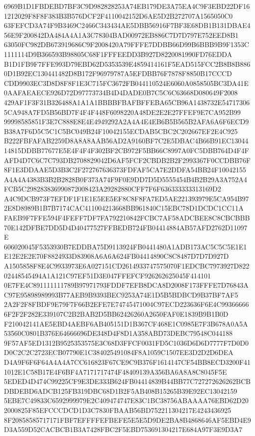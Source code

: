 \documentclass[UTF8,fontset=fandol,zihao=-4,a4paper]{ctexart}
\begin{document}
{{6969B1D1FBDEBD7BF3C9D982828253A74EB179DE3A75EA4C9F3EBD22DF161212029F8F8F383B3B576DCF2F4110042152D6AE5D2B272707A1565050C0
63FEFCD3A74F9B3469C2466C343434AE5DBB56916F7BF3E68DB1B131DBAE456E9F200842DA484A4A1A3C78304BAD00972EB886C7D7D797E752EED8B1
63050FC982DB673919686C9F2008420A79FFFE7DDBB66D99B6BBB9B9F1353C1111114D9B366593B98805C68F1FFFEEDD3B927D8220081990FD76EDDA
B1D1FB9F7FFE993D79EBD62D5353539E4859414161F5EAD515FCC2B8B8B8860D1B92EC130441482D8B172F96979787A5EFDBB76F7878F8850B17CCCD
CDD9903EC3D8D8F8F1E3C715FC3672FB044110524E6060A0858505BC3DA41E0AAFAEAECE926D72D97773734B4D4DADE0B7C5C6C63668D080649F2008
429AF1F3F31B326488A1A1A1BBBBFBAFBFFEBA65CB96A1438732E547173065CA948A7FD5B56BD7F4F4F448F6098220A48DE2E2E27FFEF9E7CA952B99
99998585851F3E7C888E8E4E4949292A2A4A4E4EB6B5B565B2AFA6A6F6ECD9B38A7F6D5C5C1C5BC049B24F10042155ECDAB5CBC2C202667EF2E4C925
B222FBFAFAB2259D8A8A8AAB56AD2A9160BF7C2E5DBAC4B66B91EC1304414815DDBB77677E5E4F4F4F302BF2CB972F5BB66C8997A0FC5DBB764D4F4F
AFD4D7C6C7C793DB2708829042D6AF5FCF2CBDB2B2F2993367F0CCDBB76F8F1E3DDAAE5D3B3C2F272767636373FDFAF5CA7E2DDFA54BB24F10042155
A4A4A4383B3B2B2828B0F373A74F9F0E9DD7D5D5555454B4B2B29A3A752A4FCB5C298283836990872008423A29282880CFF7F6F636333333313169D2
A4C9DCB973F7EFDF1F1E1E5EE5EF8C8F8FA7ED5AE221393979E5CA954B972E8D8989B1B7B7174CAC411004213668BB961840C15EBC78D1DCDC1CC11A
FAEB9F7FFE594F4FEFF7DF7FA792210842FCBC7AF58ADCBEE8C8CBCBBB70E142DFBE7DD5D4D40477527FFBEDB724FB04414884AB57AFD2762D11097E
606020045F5353930B7EDDBA75D9113924FB0441480A1ADB173AC5C5C5E1E1E12E2E2E70F8824933D83908A6A6A624FB04414890C8C8487D7D7D927D
A1505858F8E4C9933973E6A027151CD2614933747575070F1EDCBC7973927D82202448545494A1A121C97EF51D3E047FFEFCF926262625045F414101
0E7FE4C891111111789B97971793FDDF7EFB8DCA8D2008F173FFFE7D76843AC97E95898989993B77AEB9B9393BEC9253A74E1D5B5BDBCD9B37BF7AF5
2A2F2F8FBDF9E79F7F66B2EFE7E74745471004C97ECD223636F6E4C993666666F2F2F282E339107C2B2BAB2D5BB62426260A2650FAF0E1839B9B1B0D
F210042141AE5EBD4AEBF6AB405151D1B367CF468E1C0985E7F3B678A0A5A53560C0801B376E64666696DE348D4F8D1A358ABD73DEBC79548C044188
9F57AF5ED1312B9525353575E3C68D3FFCF0031FD5C1036D6D6D7777F7D0D0D0C2C2C2723ECB07790E1C384025491084F8A1059C1507EE3D2D2D6DEA
D4A9F6F6F64A4A4A7CC616823F67CE9C9B376F1614147CF54BB8ECD3200F411012E1C58B17E4F6BF4A7171717474F48409139A356BA6A8A8C8045F5E
5EDED4D474C99225CF9E3DE333B624FB04414839B44BB77C727272626262BCBDBDEBD6ADCB125FB319DBC68D1B2F5AB408B15265B39E92EC13042159
5EBE7C49833C6592999979E2C409474747E83C1BC38756ABAAAA76EBD62D202000825F85EFCCCDCD1D3C7830FBAAB56BD752211304217E4243436925
8F20858585717171FBF7EFFFFEFBEFE5E5E5D9DE2BA8B4868646AF5EBD4E9D3A559D52CACBCB1B3A7428FBC2F5EBD753691304217E684A97F3E9D3A7
}}
\end{document}
